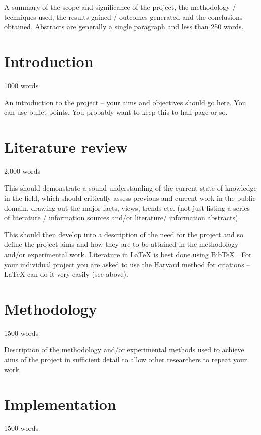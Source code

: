 \documentclass[12pt, a4paper]{article}
\begin{document}
A summary of the scope and significance of the project, the methodology / techniques used, the results gained / outcomes generated and the conclusions obtained. Abstracts are generally a single paragraph and less than 250 words.





\section{Introduction}
1000 words

An introduction to the project -- your aims and objectives should go here. You can use bullet points. You probably want to keep this to half-page or so.


\section{Literature review}
2,000 words 

This should demonstrate a sound understanding of the current state of knowledge in the field, which should critically assess previous and current work in the public domain, drawing out the major facts, views, trends etc. (not just listing a series of literature / information sources and/or literature/ information abstracts). 

This should then develop into a description of the need for the project and so define the
project aims and how they are to be attained in the methodology and/or experimental work. Literature in \LaTeX{} \cite{teipel2013relevance} is best done using BibTeX \cite{gunawardena2017applying, pradhan2024analysis}. For your individual project you are asked to use the Harvard method for citations -- \LaTeX{} can do it very easily (see above).




\section{Methodology}
1500 words

Description of the methodology and/or experimental methods used to achieve aims of the project in sufficient detail to allow other researchers to repeat your work.



\section{Implementation}
1500 words
\end{document}
